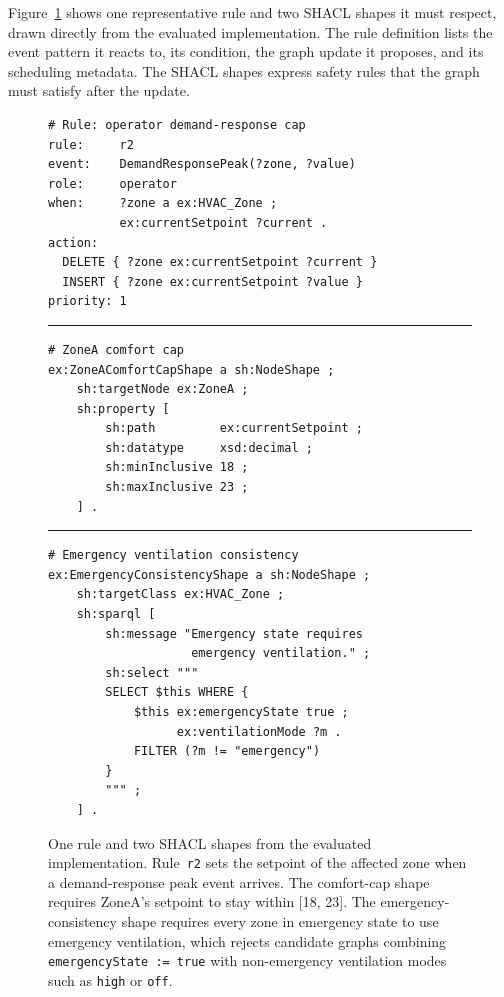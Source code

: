 \documentclass{ieeeaccess}
\theoremstyle{definition}
\theoremstyle{plain}
\theoremstyle{remark}
\begin{document}
Figure~\ref{fig:example-rule-shape} shows one representative rule and two SHACL shapes it must respect, drawn directly from the evaluated implementation. The rule definition lists the event pattern it reacts to, its condition, the graph update it proposes, and its scheduling metadata. The SHACL shapes express safety rules that the graph must satisfy after the update.

\begin{figure}[t]
\small
\begin{verbatim}
# Rule: operator demand-response cap
rule:     r2
event:    DemandResponsePeak(?zone, ?value)
role:     operator
when:     ?zone a ex:HVAC_Zone ;
          ex:currentSetpoint ?current .
action:
  DELETE { ?zone ex:currentSetpoint ?current }
  INSERT { ?zone ex:currentSetpoint ?value }
priority: 1
\end{verbatim}

\hrule
\medskip

\begin{verbatim}
# ZoneA comfort cap
ex:ZoneAComfortCapShape a sh:NodeShape ;
    sh:targetNode ex:ZoneA ;
    sh:property [
        sh:path         ex:currentSetpoint ;
        sh:datatype     xsd:decimal ;
        sh:minInclusive 18 ;
        sh:maxInclusive 23 ;
    ] .
\end{verbatim}

\hrule
\medskip

\begin{verbatim}
# Emergency ventilation consistency
ex:EmergencyConsistencyShape a sh:NodeShape ;
    sh:targetClass ex:HVAC_Zone ;
    sh:sparql [
        sh:message "Emergency state requires
                    emergency ventilation." ;
        sh:select """
        SELECT $this WHERE {
            $this ex:emergencyState true ;
                  ex:ventilationMode ?m .
            FILTER (?m != "emergency")
        }
        """ ;
    ] .
\end{verbatim}

\caption{One rule and two SHACL shapes from the evaluated implementation. Rule~\texttt{r2} sets the setpoint of the affected zone when a demand-response peak event arrives. The comfort-cap shape requires ZoneA's setpoint to stay within [18, 23]. The emergency-consistency shape requires every zone in emergency state to use emergency ventilation, which rejects candidate graphs combining \texttt{emergencyState := true} with non-emergency ventilation modes such as \texttt{high} or \texttt{off}.}
\label{fig:example-rule-shape}
\end{figure}
\end{document}

